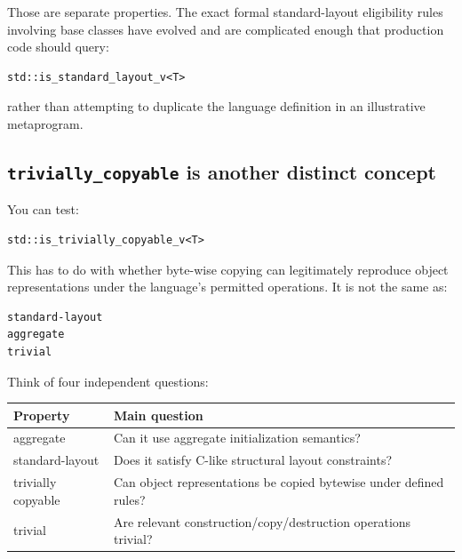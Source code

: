 Those are separate properties. The exact formal standard-layout eligibility rules involving base classes have evolved and are complicated enough that production code should query:

\begin{verbatim}
std::is_standard_layout_v<T>
\end{verbatim}

rather than attempting to duplicate the language definition in an illustrative metaprogram.

\subsection{\texorpdfstring{\texttt{trivially\_copyable} is another distinct concept}{trivially\_copyable is another distinct concept}}\label{05-engine-i-ch003-trivially_copyable-is-another-distinct-concept}

You can test:

\begin{verbatim}
std::is_trivially_copyable_v<T>
\end{verbatim}

This has to do with whether byte-wise copying can legitimately reproduce object representations under the language's permitted operations. It is not the same as:

\begin{verbatim}
standard-layout
aggregate
trivial
\end{verbatim}

Think of four independent questions:

{\def\LTcaptype{none} %
\begin{longtable}[]{@{}
  >{\raggedright\arraybackslash}p{}
  >{\raggedright\arraybackslash}p{}@{}}
\toprule\noalign{}
\begin{minipage}[b]{\linewidth}\raggedright
Property
\end{minipage} & \begin{minipage}[b]{\linewidth}\raggedright
Main question
\end{minipage} \\
\midrule\noalign{}
\endhead
\bottomrule\noalign{}
\endlastfoot
aggregate & Can it use aggregate initialization semantics? \\
standard-layout & Does it satisfy C-like structural layout constraints? \\
trivially copyable & Can object representations be copied bytewise under defined rules? \\
trivial & Are relevant construction/copy/destruction operations trivial? \\
\end{longtable}
}

